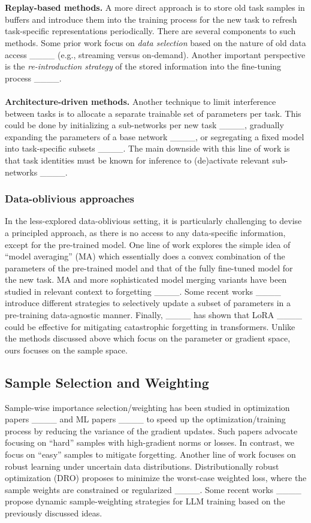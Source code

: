\\
\\
\textbf{Replay-based methods.} A more direct approach is to store old task samples in buffers and introduce them into the training process for the new task to refresh task-specific representations periodically.
There are several components to such methods. Some prior work focus on \emph{data selection} based on the nature of old data access ____ (e.g., streaming versus on-demand). Another important perspective is the \emph{re-introduction strategy} of the stored information into the fine-tuning process ____.
\\
\\
\textbf{Architecture-driven methods.} Another technique to limit interference between tasks is to allocate a separate trainable set of parameters per task. 
This could be done by initializing a sub-networks per new task ____, gradually expanding the parameters of a base network ____, or segregating a fixed model into task-specific subsets ____. 
The main downside with this line of work is that task identities must be known for inference to (de)activate relevant sub-networks ____. 

\subsubsection{Data-oblivious approaches}
In the less-explored data-oblivious setting, it is particularly challenging to devise a principled approach, as there is no access to any data-specific information, except for the pre-trained model. 
One line of work explores the simple idea of ``model averaging'' (MA) which essentially does a convex combination of the parameters of the pre-trained model and that of the fully fine-tuned model for the new task. 
MA and more sophisticated model merging variants have been studied in relevant context to forgetting ____. 
Some recent works ____ introduce different strategies to selectively update a subset of parameters in a pre-training data-agnostic manner.
Finally, ____ has shown that LoRA ____ could be effective for mitigating catastrophic forgetting in transformers. 
Unlike the methods discussed above which focus on the parameter or gradient space, ours focuses on the sample space.

\subsection{Sample Selection and Weighting}
Sample-wise importance selection/weighting has been studied in optimization papers ____ and ML papers ____ to speed up the optimization/training process by reducing the variance of the gradient updates. 
Such papers advocate focusing on \enquote{hard} samples with high-gradient norms or losses. In contrast, we focus on \enquote{easy} samples to mitigate forgetting. Another line of work focuses on robust learning under uncertain data distributions. Distributionally robust optimization (DRO) proposes to minimize the worst-case weighted loss, where the sample weights are constrained or regularized ____. 
Some recent works ____ propose dynamic sample-weighting strategies for LLM training based on the previously discussed ideas.